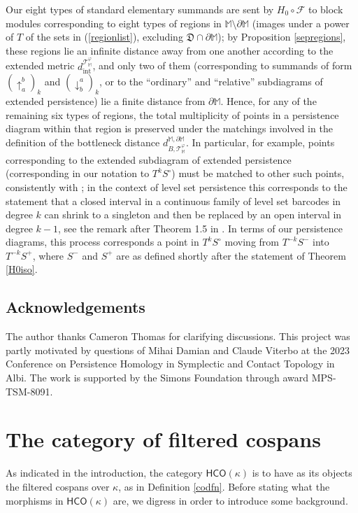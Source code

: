 \documentclass[11pt]{amsart}
\theoremstyle{definition}
\theoremstyle{remark}
\numberwithin{equation}{section}
\begin{document}
Our eight types of standard elementary summands are sent by $H_0\circ \mathcal{F}$ to block modules corresponding to eight types of regions in $\mathbb{M}\setminus \partial\mathbb{M}$ (images under a power of $T$ of the sets in (\ref{regionlist}), excluding $\mathfrak{D}\cap\partial\mathbb{M}$); by Proposition \ref{sepregions}, these regions lie an infinite distance away from one another according to the extended metric $d_{\mathrm{int}}^{\mathcal{T}_{\mathbb{M}}^{\varphi}}$, and only two of them (corresponding to summands of form $(\uparrow_a^b)_k$ and $(\downarrow^a_b)_k$, or to the ``ordinary'' and ``relative'' subdiagrams of extended persistence) lie a finite distance from $\partial\mathbb{M}$.  Hence, for any of the remaining six types of regions, the total multiplicity of points in a persistence diagram within that region is preserved under the matchings involved in the definition of the bottleneck distance $d_{B,\mathcal{T}_{\mathbb{M}}^{\varphi}}^{\mathbb{M},\partial\mathbb{M}}$.  In particular, for example, points corresponding to the extended subdiagram of extended persistence (corresponding in our notation to $T^kS^{\circ}$) must be matched to other such points, consistently with \cite[Remark 2.5]{BBF20}; in the context of level set persistence this corresponds to the statement that a closed interval in a continuous family of level set barcodes in degree $k$ can shrink to a singleton and then be replaced by an open interval in degree $k-1$, see the remark after Theorem 1.5 in \cite{BH}.  In terms of our persistence diagrams, this process corresponds a point in $T^kS^{\circ}$ moving from $T^{-k}S^-$ into $T^{-k}S^+$, where $S^-$ and $S^+$ are as defined shortly after the statement of Theorem \ref{H0iso}.  

\subsection*{Acknowledgements}  The author thanks Cameron Thomas for clarifying discussions.  This project was partly motivated by questions of Mihai Damian and Claude Viterbo at the 2023 Conference on Persistence Homology in Symplectic and Contact Topology in Albi.  The work is supported by the Simons Foundation through award MPS-TSM-8091.

\section{The category of filtered cospans}\label{catsect}

As indicated in the introduction, the category $\mathsf{HCO}(\kappa)$ is to have as its objects the filtered cospans over $\kappa$, as   in Definition \ref{codfn}.
Before stating what the morphisms in $\mathsf{HCO}(\kappa)$ are, we digress in order to introduce some background. %
\end{document}
